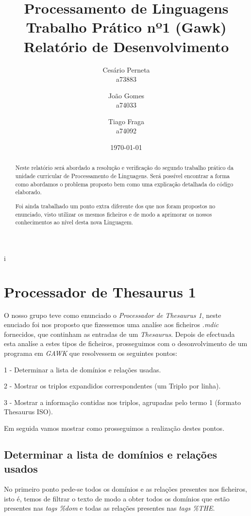 \documentclass{report}
\title{Processamento de Linguagens\\ \textbf{Trabalho Prático nº1 (Gawk)}\\ Relatório de Desenvolvimento}
\author{Cesário Perneta\\ a73883 \and João Gomes\\ a74033 \and Tiago Fraga\\ a74092}
\date{\today}
\def\titulo#1{\section{#1}}
\begin{document}

\maketitle

\begin{abstract}
    Neste relatório será abordado a resolução e verificação do segundo trabalho prático da unidade curricular de Processamento de Linguagens. Será possível encontrar a forma como abordamos o problema proposto bem como uma explicação detalhada do código elaborado.
    
    Foi ainda trabalhado um ponto extra diferente dos que nos foram propostos no enunciado, visto utilizar os mesmos ficheiros e de modo a aprimorar os nossos conhecimentos ao nível desta nova Linguagem.
\end{abstract}i

\tableofcontents

\chapter{ Processador de Thesaurus 1} \label{intro}
    
    O nosso grupo teve como enunciado o \textit{Processador de Thesaurus 1}, neste enuciado foi nos proposto que fizessemos uma analíse aos ficheiros \textit{.mdic} fornecidos, que continham as entradas de um \textit{Thesaurus}.
    Depois de efectuada esta analíse a estes tipos de ficheiros, prosseguimos com o desonvolvimento de um programa em \textit{GAWK} que resolvessem os seguintes pontos:
        
        1 - Determinar a lista de domínios e relações usadas.
        
        2 - Mostrar os triplos expandidos correspondentes (um Triplo por linha).
        
        3 - Mostrar a informação contidas nos triplos, agrupadas pelo termo 1 (formato Thesaurus ISO).

    Em seguida vamos mostrar como prosseguimos a realização destes pontos. 

\titulo{ Determinar a lista de domínios e relações usados }

    No primeiro ponto pede-se todos os domínios e as relações presentes nos ficheiros, isto é, temos de filtrar o texto de modo a obter todos os domínios que estão presentes nas \textit{tags \%dom} e todas as relações presentes nas \textit{tags \%THE}.
\end{document}
